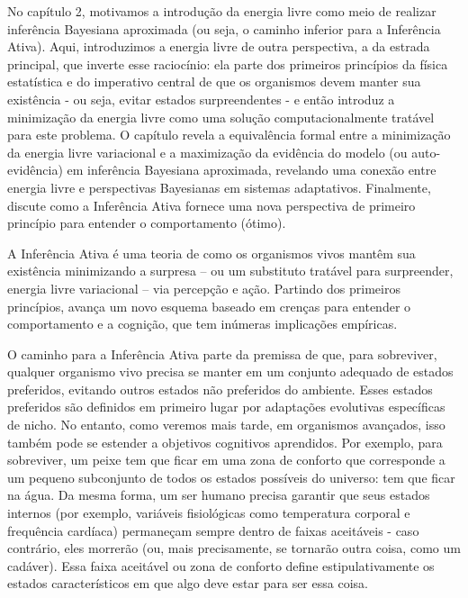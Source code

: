 \documentclass[
  12pt,
]{book}
\begin{document}
No capítulo 2, motivamos a introdução da energia livre como meio de realizar inferência Bayesiana aproximada (ou seja, o caminho inferior para a Inferência Ativa). Aqui, introduzimos a energia livre de outra perspectiva, a da estrada principal, que inverte esse raciocínio: ela parte dos primeiros princípios da física estatística e do imperativo central de que os organismos devem manter sua existência - ou seja, evitar estados surpreendentes - e então introduz a minimização da energia livre como uma solução computacionalmente tratável para este problema. O capítulo revela a equivalência formal entre a minimização da energia livre variacional e a maximização da evidência do modelo (ou auto-evidência) em inferência Bayesiana aproximada, revelando uma conexão entre energia livre e perspectivas Bayesianas em sistemas adaptativos. Finalmente, discute como a Inferência Ativa fornece uma nova perspectiva de primeiro princípio para entender o comportamento (ótimo).

A Inferência Ativa é uma teoria de como os organismos vivos mantêm sua existência minimizando a surpresa -- ou um substituto tratável para surpreender, energia livre variacional -- via percepção e ação. Partindo dos primeiros princípios, avança um novo esquema baseado em crenças para entender o comportamento e a cognição, que tem inúmeras implicações empíricas.

O caminho para a Inferência Ativa parte da premissa de que, para sobreviver, qualquer organismo vivo precisa se manter em um conjunto adequado de estados preferidos, evitando outros estados não preferidos do ambiente. Esses estados preferidos são definidos em primeiro lugar por adaptações evolutivas específicas de nicho. No entanto, como veremos mais tarde, em organismos avançados, isso também pode se estender a objetivos cognitivos aprendidos. Por exemplo, para sobreviver, um peixe tem que ficar em uma zona de conforto que corresponde a um pequeno subconjunto de todos os estados possíveis do universo: tem que ficar na água. Da mesma forma, um ser humano precisa garantir que seus estados internos (por exemplo, variáveis \hspace{0pt}\hspace{0pt}fisiológicas como temperatura corporal e frequência cardíaca) permaneçam sempre dentro de faixas aceitáveis \hspace{0pt}\hspace{0pt}- caso contrário, eles morrerão (ou, mais precisamente, se tornarão outra coisa, como um cadáver). Essa faixa aceitável ou zona de conforto define estipulativamente os estados característicos em que algo deve estar para ser essa coisa.
\end{document}
